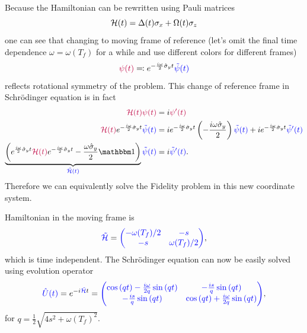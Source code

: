Because the Hamiltonian can be rewritten using Pauli matrices
\begin{equation}
    \mathcal{H}(t) = \Delta(t)\sigma_x+ \Omega(t)\sigma_z
\end{equation}
one can see that changing to moving frame of reference (let's omit the final time dependence $\omega=\omega(T_f)$ for a while and use different colors for different frames) 
\begin{equation}
    \textcolor{purple}{\psi(t)} \eqqcolon e^{-\frac{i \omega}{2}\hat\sigma_y t} \textcolor{blue}{\tilde\psi(t)}
\end{equation}
reflects rotational symmetry of the problem. This change of reference frame in Schr\"odinger equation is in fact
\begin{equation}
    \begin{split}
        \textcolor{purple}{\H(t)\psi(t)} &= i\textcolor{purple}{\psi'(t)}\\
        \textcolor{purple}{\H(t)} \expsm\textcolor{blue}{\tilde\psi(t)} &= i \expsm \left(-\frac{i\omega\hat\sigma_y}{2}\right)\textcolor{blue}{\tilde\psi(t)}+i\expsm\textcolor{blue}{\tilde\psi'(t)}\\
        \underbrace{\left(\expsp \textcolor{purple}{\H(t)}\expsm- \frac{\omega\hat\sigma_y}{2}\Id\right)}_{\textcolor{blue}{\tilde\H(t)}}\textcolor{blue}{\tilde\psi(t)}&=i\textcolor{blue}{\tilde\psi'(t)}.
    \end{split}
\end{equation}
Therefore we can equivalently solve the Fidelity problem in this new coordinate system.

Hamiltonian in the moving frame is
\begin{equation}
    \textcolor{blue}{\tilde{\mathcal{H}}}=\textcolor{blue}{\begin{pmatrix}
        -\omega(T_f)/2&-s\\
        -s&\omega(T_f)/2
    \end{pmatrix}},
\end{equation}
which is time independent. The Schr\"odinger equation can now be easily solved using evolution operator
\begin{equation}
    \textcolor{blue}{\hat U(t)}=e^{-i\textcolor{blue}{\tilde{\mathcal{H}}}t}=\textcolor{blue}{\begin{pmatrix}
        \cos{(qt)}-\frac{i\omega}{2q}\sin{(qt)} & -\frac{is}{q}\sin{(qt)}\\
        -\frac{is}{q}\sin{(qt)}&\cos{(qt)}+\frac{i\omega}{2q}\sin{(qt)}
    \end{pmatrix}},
\end{equation}
for $q=\frac{1}{2}\sqrt{4s^2+\omega(T_f)^2}$.

